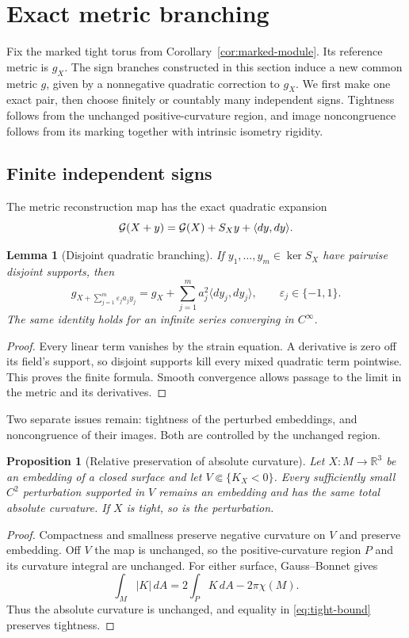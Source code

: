 \documentclass[11pt]{amsart}
\newtheorem{proposition}[theorem]{Proposition}
\newtheorem{lemma}[theorem]{Lemma}
\theoremstyle{definition}
\theoremstyle{remark}
\newcommand{\R}{\mathbb R}\newcommand{\Sph}{\mathbb S}
\numberwithin{equation}{section}
\begin{document}
\section{Exact metric branching}\label{sec:reconstruction}
Fix the marked tight torus from Corollary~\ref{cor:marked-module}.
Its reference metric is $g_X$. The sign branches constructed in this
section induce a new common metric $g$, given by a nonnegative quadratic
correction to $g_X$. We first make one exact pair, then choose finitely
or countably many independent signs. Tightness follows from the
unchanged positive-curvature region, and image noncongruence follows
from its marking together with intrinsic isometry rigidity.

\subsection{Finite independent signs}
The metric reconstruction map has the exact quadratic expansion
\begin{equation}\label{eq:metricquad}
 \mathcal G(X+y)=\mathcal G(X)+S_Xy+\langle dy,dy\rangle.
\end{equation}
\begin{lemma}[Disjoint quadratic branching]\label{thm:branch}
If $y_1,\ldots,y_m\in\ker S_X$ have pairwise disjoint supports, then
\begin{equation}\label{eq:abstractsign}
 g_{X+\sum_{j=1}^m\varepsilon_j a_jy_j}
 =g_X+\sum_{j=1}^m a_j^2\langle dy_j,dy_j\rangle,
 \qquad\varepsilon_j\in\{-1,1\}.
\end{equation}
The same identity holds for an infinite series converging in $C^\infty$.
\end{lemma}
\begin{proof}
Every linear term vanishes by the strain equation. A derivative is zero
off its field's support, so disjoint supports kill every mixed quadratic
term pointwise. This proves the finite formula. Smooth convergence allows
passage to the limit in the metric and its derivatives.
\end{proof}

Two separate issues remain: tightness of the perturbed embeddings, and
noncongruence of their images. Both are controlled by the unchanged region.
\begin{proposition}[Relative preservation of absolute curvature]\label{prop:budget}
Let $X:M\to\R^3$ be an embedding of a closed surface and let
$V\Subset\{K_X<0\}$.
Every sufficiently small $C^2$ perturbation supported in $V$ remains an
embedding and has the same total absolute curvature. If $X$ is tight,
so is the perturbation.
\end{proposition}
\begin{proof}
Compactness and smallness preserve negative curvature on $V$ and preserve
embedding. Off $V$ the map is unchanged, so the positive-curvature region
$P$ and its curvature integral are unchanged. For either surface,
Gauss--Bonnet gives
\[
 \int_M|K|\,dA=2\int_P K\,dA-2\pi\chi(M).
\]
Thus the absolute curvature is unchanged, and equality in
\eqref{eq:tight-bound} preserves tightness.
\end{proof}
\end{document}
